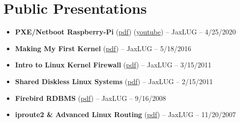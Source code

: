 \documentclass[10pt]{report}
\begin{document}
\section*{Public Presentations}
\begin{itemize}
  \item \textbf{PXE/Netboot Raspberry-Pi} (\href{https://github.com/wltjr/presentations/blob/master/presentations/2020-04-15_jaxlug_pxe_network_booting_raspberry_pis.pdf}{pdf}) (\href{https://www.youtube.com/watch?v=kT5jlbRNgcE}{youtube}) – JaxLUG – 4/25/2020
  \item \textbf{Making My First Kernel} (\href{https://github.com/wltjr/presentations/blob/master/presentations/2016-05-18_jaxlug_making_my_first_kernel.pdf}{pdf}) – JaxLUG – 5/18/2016
  \item \textbf{Intro to Linux Kernel Firewall} (\href{https://github.com/wltjr/presentations/blob/master/presentations/2011-03-15_jaxlug_intro_to_linux_kernel_firewall.pdf}{pdf}) – JaxLUG – 3/15/2011
  \item \textbf{Shared Diskless Linux Systems} (\href{https://github.com/wltjr/presentations/blob/master/presentations/2011-02-15_jaxlug_shared_diskless_linux_systems.pdf}{pdf}) – JaxLUG – 2/15/2011
  \item \textbf{Firebird RDBMS} (\href{https://github.com/wltjr/presentations/blob/master/presentations/2008_09_16_jaxlug_firebird_rdbms.pdf}{pdf}) – JaxLUG – 9/16/2008
  \item \textbf{iproute2 \& Advanced Linux Routing} (\href{https://github.com/wltjr/presentations/blob/master/presentations/2007_11_20_jaxlug_iproute2_and_advanced_linux_routing.pdf}{pdf}) – JaxLUG – 11/20/2007
\end{itemize}
\end{document}
